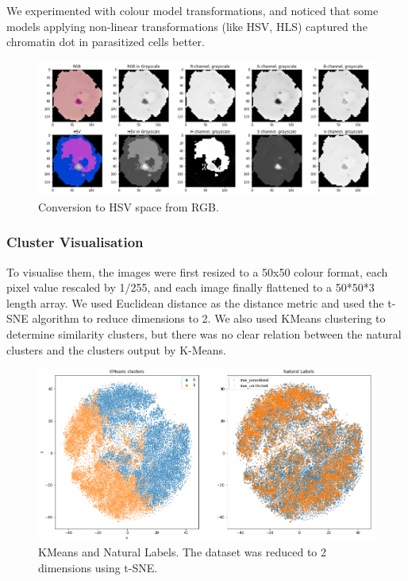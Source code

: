 \documentclass[10pt,twocolumn,letterpaper]{article}
\begin{document}
We experimented with colour model transformations, and noticed that some models applying non-linear transformations (like HSV, HLS) captured the chromatin dot in parasitized cells better.

\begin{figure}[t]
   \begin{center}
      \includegraphics[width=1\linewidth]{../Plots/hsv_conversion.png}
   \end{center}
      \caption{Conversion to HSV space from RGB.}
   \label{fig:HSV_space}
\end{figure}

\subsubsection{Cluster Visualisation}
To visualise them, the images were first resized to a 50x50 colour format, each pixel value rescaled by 1/255, and each image finally flattened to a 50*50*3 length array. We used Euclidean distance as the distance metric and used the t-SNE algorithm to reduce dimensions to 2. We also used KMeans clustering to determine similarity clusters, but there was no clear relation between the natural clusters and the clusters output by K-Means. 

\begin{figure}[t]
   \begin{center}
      \includegraphics[width=1\linewidth]{../Plots/kmeans_natural labels.png}
   \end{center}
      \caption{KMeans and Natural Labels. The dataset was reduced to 2 dimensions using t-SNE.}
   \label{fig:tsne_vis}
\end{figure}
\end{document}
